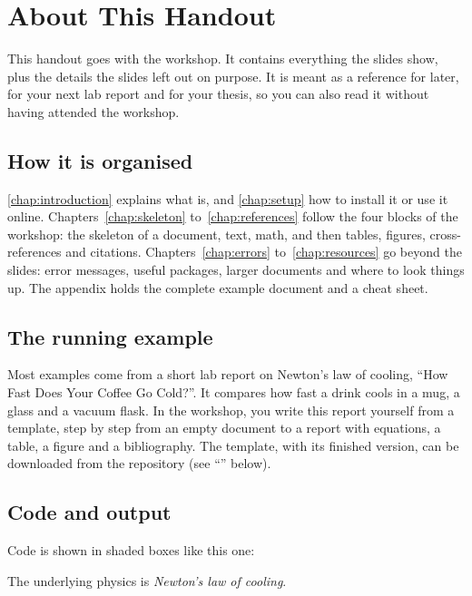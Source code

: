 \chapter*{About This Handout}\label{chap:about}

This handout goes with the  workshop.
It contains everything the slides show,
plus the details the slides left out on purpose.
It is meant as a reference for later, for your next lab report and for your thesis,
so you can also read it without having attended the workshop.

\section*{How it is organised}

\autoref{chap:introduction} explains what  is,
and \autoref{chap:setup} how to install it or use it online.
Chapters~\ref{chap:skeleton} to~\ref{chap:references} follow the four blocks of the workshop:
the skeleton of a document, text, math, and then tables, figures, cross-references and citations.
Chapters~\ref{chap:errors} to~\ref{chap:resources} go beyond the slides:
error messages, useful packages, larger documents and where to look things up.
The appendix holds the complete example document and a cheat sheet.

\section*{The running example}

Most examples come from a short lab report on Newton's law of cooling,
\enquote{How Fast Does Your Coffee Go Cold?}.
It compares how fast a drink cools in a mug, a glass and a vacuum flask.
In the workshop, you write this report yourself from a template,
step by step from an empty document to a report with equations, a table, a figure and a bibliography.
The template, with its finished version, can be downloaded from the repository (see \enquote{} below).

\section*{Code and output}

Code is shown in shaded boxes like this one:

\begin{codeblock}
The underlying physics is \textit{Newton's law of cooling}.
\end{codeblock}

